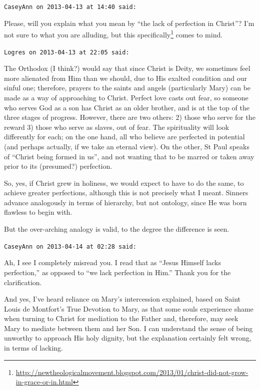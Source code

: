 \begin{footnotesize}\begin{sffamily}

\texttt{CaseyAnn on 2013-04-13 at 14:40 said: }

Please, will you explain what you mean by ``the lack of perfection in Christ''? I'm not sure to what you are alluding, but this specifically\footnote{\url{http://newtheologicalmovement.blogspot.com/2013/01/christ-did-not-grow-in-grace-or-in.html}} comes to mind.


\hfill

\texttt{Logres on 2013-04-13 at 22:05 said: }

The Orthodox (I think?) would say that since Christ is Deity, we sometimes feel more alienated from Him than we should, due to His exalted condition and our sinful one; therefore, prayers to the saints and angels (particularly Mary) can be made as a way of approaching to Christ. Perfect love casts out fear, so someone who serves God as a son has Christ as an older brother, and is at the top of the three stages of progress. However, there are two others: 2) those who serve for the reward 3) those who serve as slaves, out of fear. The spirituality will look differently for each; on the one hand, all who believe are perfected in potential (and perhaps actually, if we take an eternal view). On the other, St Paul speaks of “Christ being formed in us”, and not wanting that to be marred or taken away prior to its (presumed?) perfection.

So, yes, if Christ grew in holiness, we would expect to have to do the same, to achieve greater perfections, although this is not precisely what I meant. Sinners advance analogously in terms of hierarchy, but not ontology, since He was born flawless to begin with. 

But the over-arching analogy is valid, to the degree the difference is seen.


\hfill

\texttt{CaseyAnn on 2013-04-14 at 02:28 said: }

Ah, I see I completely misread you. I read that as “Jesus Himself lacks perfection,” as opposed to “we lack perfection in Him.” Thank you for the clarification. 

And yes, I've heard reliance on Mary's intercession explained, based on Saint Louis de Montfort's True Devotion to Mary, as that some souls experience shame when turning to Christ for mediation to the Father and, therefore, may seek Mary to mediate between them and her Son. I can understand the sense of being unworthy to approach His holy dignity, but the explanation certainly felt wrong, in terms of lacking.


\end{sffamily}
\end{footnotesize}
